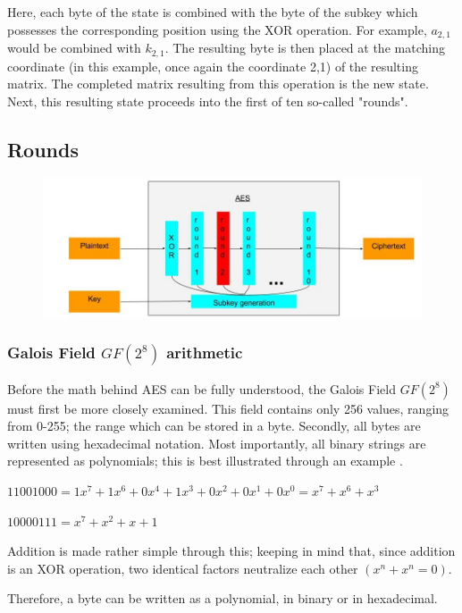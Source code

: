 \documentclass[12pt]{report}
\theoremstyle{definition}
\theoremstyle{remark}
\begin{document}
Here, each byte of the state is combined with the byte of the subkey which possesses the corresponding position using the XOR operation. For example, $a_{2,1}$ would be combined with $k_{2,1}$. The resulting byte is then placed at the matching coordinate (in this example, once again the coordinate 2,1) of the resulting matrix. The completed matrix resulting from this operation is the new state. Next, this resulting state proceeds into the first of ten so-called "rounds".

\subsection{Rounds}

\begin{figure}[H]
\centering
\includegraphics[scale=0.4]{AES_fig3.jpg}
\end{figure}

\subsubsection{Galois Field $GF(2^8)$ arithmetic}
Before the math behind AES can be fully understood, the Galois Field $GF(2^8)$ must first be more closely examined. This field contains only 256 values, ranging from 0-255; the range which can be stored in a byte. Secondly, all bytes are written using hexadecimal notation. Most importantly, all binary strings are represented as polynomials; this is best illustrated through an example \cite{GFieldExample}.

$11001000 = 1x^7+1x^6+0x^4+1x^3+0x^2+0x^1+0x^0 = x^7+x^6+x^3 $ 

$10000111 = x^7+x^2+x+1$

Addition is made rather simple through this; keeping in mind that, since addition is an XOR operation, two identical factors neutralize each other $(x^n+x^n = 0)$.

Therefore, a byte can be written as a polynomial, in binary or in hexadecimal\cite{BinHex}.
\end{document}
